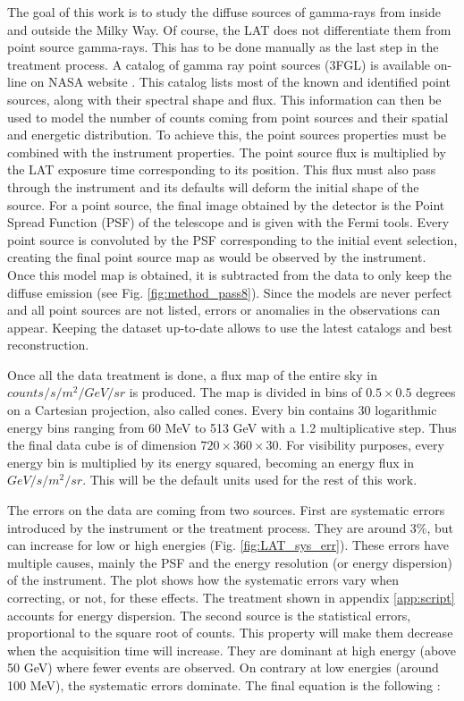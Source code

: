 The goal of this work is to study the diffuse sources of gamma-rays from inside and outside the Milky Way. Of course, the LAT does not differentiate them from point source gamma-rays. This has to be done manually as the last step in the treatment process. A catalog of gamma ray point sources (3FGL) is available on-line on NASA website \cite{3FGL2015}. This catalog lists most of the known and identified point sources, along with their spectral shape and flux. This information can then be used to model the number of counts coming from point sources and their spatial and energetic distribution. To achieve this, the point sources properties must be combined with the instrument properties. The point source flux is multiplied by the LAT exposure time corresponding to its position. This flux must also pass through the instrument and its defaults will deform the initial shape of the source. For a point source, the final image obtained by the detector is the Point Spread Function (PSF) of the telescope and is given with the Fermi tools. Every point source is convoluted by the PSF corresponding to the initial event selection, creating the final point source map as would be observed by the instrument.
Once this model map is obtained, it is subtracted from the data to only keep the diffuse emission (see Fig. \ref{fig:method_pass8}). Since the models are never perfect and all point sources are not listed, errors or anomalies in the observations can appear. Keeping the dataset up-to-date allows to use the latest catalogs and best reconstruction.


Once all the data treatment is done, a flux map of the entire sky in $counts/s/m^2/GeV/sr$ is produced. The map is divided in bins of $0.5 \times 0.5$ degrees on a Cartesian projection, also called cones. Every bin contains 30 logarithmic energy bins ranging from 60 MeV to 513 GeV with a 1.2 multiplicative step. Thus the final data cube is of dimension $720 \times 360 \times 30$. For visibility purposes, every energy bin is multiplied by its energy squared, becoming an energy flux in $GeV/s/m^2/sr$. This will be the default units used for the rest of this work.

The errors on the data are coming from two sources. First are systematic errors introduced by the instrument or the treatment process. They are around 3\%, but can increase for low or high energies (Fig. \ref{fig:LAT_sys_err}). These errors have multiple causes, mainly the PSF and the energy resolution (or energy dispersion) of the instrument. The plot shows how the systematic errors vary when correcting, or not, for these effects. The treatment shown in appendix \ref{app:script} accounts for energy dispersion.
The second source is the statistical errors, proportional to the square root of counts. This property will make them decrease when the acquisition time will increase. They are dominant at high energy (above 50 GeV) where fewer events are observed. On contrary at low energies (around 100 MeV), the systematic errors dominate. The final equation is the following :


